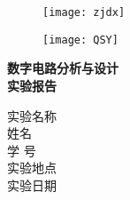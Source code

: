 \documentclass{article}
\begin{document}
\begin{titlepage}
        \vspace*{-3cm}
	
	\begin{figure}[h]
		\centering
		\texttt{[image: zjdx]}
	\end{figure}

	\vspace*{0.5cm}
	\begin{figure}[h]
		\centering
		\texttt{[image: QSY]}
	\end{figure}
	\vspace{-0.5cm}
	\begin{center}
		\Huge{\textbf{数字电路分析与设计}}\\
		
		\Huge{\textbf{实验报告}}
	\end{center}
	
	\vspace*{0.5cm}


	\vspace*{1cm}
    \begin{center}
            \Large 实验名称\ \ \underline{} \\ 
            \vspace{0.3cm}
            \Large 姓名 \ \ \underline{} \\ 
            \vspace{0.3cm}
            学  号\ \ \underline{}\\
            \vspace{0.3cm}
            实验地点\ \ \underline{}\\
            \vspace{0.3cm}
            实验日期\ \ \underline{}\\
            

             
    \end{center}
        
    
\end{titlepage}

\newpage
\tableofcontents
\thispagestyle{empty}%
\listoffigures%
\thispagestyle{empty}%
\end{document}
